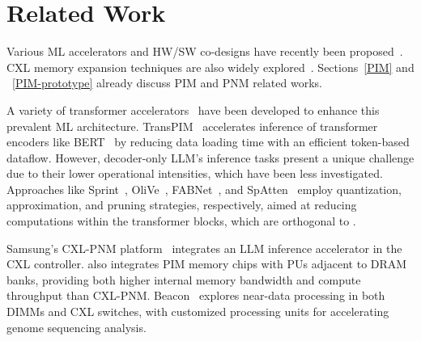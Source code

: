 \section{Related Work}
Various ML accelerators and HW/SW co-designs have recently been proposed~\cite{eyeriss, in-switch, maeri}. CXL memory expansion techniques are also widely explored~\cite{CXL-DL, CXL-DB, Demystify-CXL, cxl-memory-pool, jang2023cxl, gouk2022direct}. Sections~\ref{PIM} and ~\ref{PIM-prototype} already discuss PIM and PNM related works.

 A variety of transformer accelerators~\cite{elsa, dota, sanger, FACT} have been developed to enhance this prevalent ML architecture.
TransPIM~\cite{transpim} accelerates inference of transformer encoders like BERT~\cite{bert} by reducing data loading time with an efficient token-based dataflow.
However, decoder-only LLM's inference tasks present a unique challenge due to their lower operational intensities, which have been less investigated. 
Approaches like Sprint~\cite{sprint}, OliVe~\cite{olive}, FABNet~\cite{FABNet}, and SpAtten~\cite{spatten} employ quantization, approximation, and pruning strategies, respectively, aimed at reducing computations within the transformer blocks, which are orthogonal to \att{}.

  Samsung's CXL-PNM platform~\cite{cxl-pnm, samsung_pimpnm} integrates an LLM inference accelerator in the CXL controller. \att{} also integrates PIM memory chips with PUs adjacent to DRAM banks, providing both higher internal memory bandwidth and compute throughput than CXL-PNM.
Beacon~\cite{huangfu2022beacon} explores near-data processing in both DIMMs and CXL switches, with customized processing units for accelerating genome sequencing analysis.



